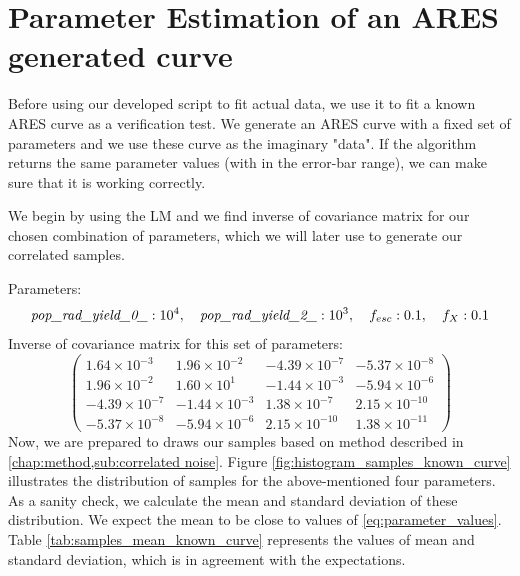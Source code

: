 \documentclass[12pt, TexShade, letterpaper]{report}
\begin{document}
\section{Parameter Estimation of an ARES generated curve}
Before using our developed script to fit actual data, we use it to fit a known ARES curve as a verification test. We generate an ARES curve with a fixed set of parameters and we use these curve as the imaginary "data". If the algorithm returns the same parameter values (with in the error-bar range), we can make sure that it is working correctly.\par
We begin by using the LM and we find inverse of covariance matrix for our chosen combination of parameters, which we will later use to generate our correlated samples.\par
Parameters:
\begin{equation}
\emph{pop\_rad\_yield\_0\_}: 10^4, \quad \emph{pop\_rad\_yield\_2\_}: 10^3,\quad f_{esc}: 0.1,\quad f_X: 0.1 
\label{eq:parameter_values}
\end{equation}
Inverse of covariance matrix for this set of parameters:
\begin{equation}
\label{eq:cov_mat_known_curve}
    \begin{pmatrix}
    1.64\times 10^{-3} & 1.96 \times 10^{-2} &  -4.39 \times 10^{-7} &  -5.37 \times 10^{-8} \\
    1.96 \times 10^{-2} &  1.60 \times 10^{1} &  -1.44 \times 10^{-3} &  -5.94 \times 10^{-6} \\
    -4.39 \times 10^{-7} &  -1.44 \times 10^{-3} &  1.38 \times 10^{-7} &  2.15 \times 10^{-10} \\
    -5.37 \times 10^{-8} &  -5.94 \times 10^{-6} &  2.15 \times 10^{-10} &  1.38 \times 10^{-11} 
    \end{pmatrix}
\end{equation}
Now, we are prepared to draws our samples based on method described in \ref{chap:method,sub:correlated noise}. Figure \ref{fig:histogram_samples_known_curve} illustrates the distribution of samples for the above-mentioned four parameters. As a sanity check, we calculate the mean and standard deviation of these distribution. We expect the mean to be close to values of \ref{eq:parameter_values}. Table \ref{tab:samples_mean_known_curve} represents the values of mean and standard deviation, which is in agreement with the expectations.\par
\end{document}
